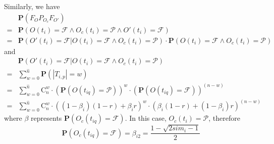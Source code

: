 Similarly, we have
\begin{equation}
\label{equ: F and P and F}
\begin{aligned}
& \mathbf{P}(F_O P_{O_c} F_{O'}) \\
= & \mathbf{P}(O(t_i) = \mathcal{F} \wedge O_c(t_i) = \mathcal{P} \wedge O'(t_i) = \mathcal{F}) \\
= & \mathbf{P}(O'(t_i) = \mathcal{F} | O(t_i) = \mathcal{F} \wedge O_c(t_i) = \mathcal{P}) \cdot \mathbf{P}(O(t_i) = \mathcal{F} \wedge O_c(t_i) = \mathcal{P})
\end{aligned}
\end{equation}
and
\begin{equation}
\begin{aligned}
& \mathbf{P}(O'(t_i) = \mathcal{F} | O(t_i) = \mathcal{F} \wedge O_c(t_i) = \mathcal{P}) \\
= & \sum_{w = 0}^{\hat{n}}{\mathbf{P}(|T_{i,p}| = w)} \\
= & \sum_{w = 0}^{\hat{n}}
{
	\mathrm{C}_n^w
	\cdot{(\mathbf{P}(O(t_{iq}) = \mathcal{P}))}^w 
	\cdot {(\mathbf{P}(O(t_{iq}) = \mathcal{F}))}^{(n-w)}
}
\\
= & \sum_{w = 0}^{\hat{n}}
{	\mathrm{C}_n^w
	\cdot {((1-\beta_i)(1-r) + \beta_i r)}^w
	\cdot {(\beta_i (1 - r) + (1- \beta_i)r)}^{(n - w)}
}
\end{aligned}
\end{equation}
where $\beta$ represents $\mathbf{P}(O_c(t_{iq}) = \mathcal{F})$. In this case, $O_c(t_i) = \mathcal{P}$, therefore
\begin{equation*}
\mathbf{P}(O_c(t_{iq}) = \mathcal{F}) = \beta_{i2} = \frac{1 - \sqrt{2 {sim}_i - 1}}{2}
\end{equation*}

